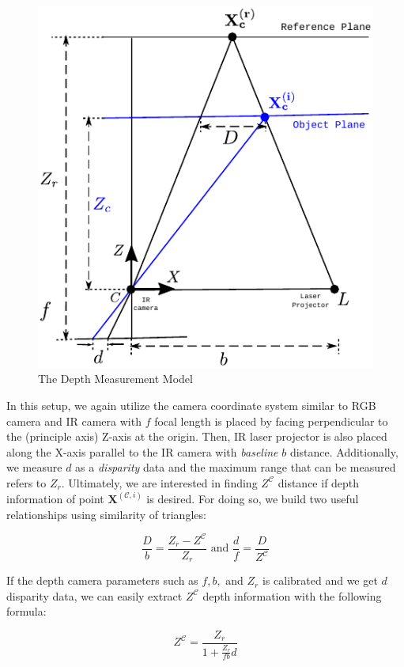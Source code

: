 \documentclass[a4paper]{report}
\numberwithin{figure}{section}
\begin{document}
\begin{figure}[H]
	\centering
  \includegraphics[width=0.65\linewidth,natwidth=640,natheight=640]
  {fig/drawings/triangulation.pdf}
  \caption[The Depth Measurement Model]{The Depth Measurement Model}
	\label{fig:triangulation_model}
\end{figure}

In this setup, we again utilize the camera coordinate system similar to RGB 
camera and IR camera with $f$ focal length is placed by facing perpendicular 
to the (principle axis) Z-axis at the origin. Then, IR laser projector is also 
placed along the X-axis parallel to the IR camera with \textit{baseline} 
$b$ distance.  
Additionally, we measure $d$ as a \textit{disparity} data and the maximum 
range that can be measured refers to $Z_r$. Ultimately, we are interested in 
finding $Z^{\mathcal{C}}$ distance if depth information of point 
$\mathbf{X}^{(\mathcal{C}, i)}$ is 
desired. For doing so, we build two useful relationships using similarity of 
triangles:


\begin{equation}
  \frac{D}{b} = \frac{Z_r - Z^{\mathcal{C}}}{Z_r} \text{ and } \frac{d}{f} = 
  \frac{D}{Z^{\mathcal{C}}}
\end{equation}

If the depth camera parameters such as $f, b,$ and $Z_r$ is calibrated and we 
get $d$ disparity data, we can easily extract $Z^{\mathcal{C}}$ depth 
information with the 
following formula:

\begin{equation}\label{eq:depth_wo_disparity}
  Z^{\mathcal{C}} = \frac{Z_r}{1+\frac{Z_r}{fb}d}
\end{equation}
\end{document}
